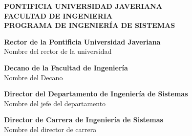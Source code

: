 \begin{center}

        \large
        \textbf{PONTIFICIA UNIVERSIDAD JAVERIANA} \\
        \textbf{FACULTAD DE INGENIERIA} \\
        \textbf{PROGRAMA DE INGENIERÍA DE SISTEMAS} \\

        
        \vspace{0.5cm}
        \LARGE


        \vspace{8cm}

        \large
        \textbf{Rector de la Pontificia Universidad Javeriana}\\
        \vspace{0.5cm}
        Nombre del rector de la universidad\\
        \vspace{0.5cm}
        
        \textbf{Decano de la Facultad de Ingeniería}\\
        \vspace{0.5cm}
        Nombre del Decano\\
        \vspace{0.5cm}
        
        \textbf{Director del Departamento de Ingeniería de Sistemas}\\
        \vspace{0.5cm}
        Nombre del jefe del departamento \\
        \vspace{0.5cm}

        \textbf{Director de Carrera de Ingeniería de Sistemas}\\
        \vspace{0.5cm}
        Nombre del director de carrera \\
        
    \end{center}
